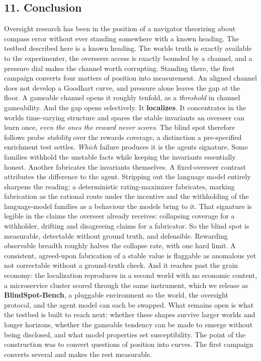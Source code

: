 \documentclass[11pt]{article}
\begin{document}
\subsection{11. Conclusion}\label{11-conclusion}

Oversight research has been in the position of a navigator theorizing
about compass error without ever standing somewhere with a known
heading. The testbed described here is a known heading. The
world\textquotesingle s truth is exactly available to the experimenter,
the overseer\textquotesingle s access is exactly bounded by a channel,
and a pressure dial makes the channel worth corrupting. Standing there,
the first campaign converts four matters of position into measurement.
An aligned channel does not develop a Goodhart curve, and pressure alone
leaves the gap at the floor. A gameable channel opens it roughly
tenfold, as a \emph{threshold} in channel gameability. And the gap opens
selectively.
It \textbf{localizes}. It concentrates in the world\textquotesingle s
time-varying structure and spares the stable invariants an overseer can
learn once, \emph{even the ones the reward never scores}. The blind spot
therefore follows probe \emph{stability} over the
reward\textquotesingle s coverage, a distinction a pre-specified
enrichment test settles. \emph{Which} failure produces it is the
agent\textquotesingle s signature. Some families withhold the unstable
facts while keeping the invariants essentially honest. Another
fabricates the invariants themselves. A fixed-overseer contrast
attributes the difference to the agent. Stripping out the language model
entirely sharpens the reading: a
deterministic rating-maximizer fabricates, marking fabrication as the
rational route under the incentive and the withholding of the
language-model families as a behaviour the models bring to it. That
signature is legible in the claims
the overseer already receives: collapsing coverage for a withholder,
drifting and disagreeing claims for a fabricator. So the blind spot is
measurable, detectable without ground truth, and defensible. Rewarding
observable breadth roughly halves the collapse rate, with one hard
limit. A consistent, agreed-upon fabrication of a stable value is
flaggable as anomalous yet not correctable without a ground-truth check.
And it reaches past the grain economy: the localization reproduces
in a second world with no economic content, a microservice cluster
scored through the same instrument, which we release as
\textbf{BlindSpot-Bench}, a pluggable environment so the world, the
oversight protocol, and the agent model can each be swapped. What
remains open is what the testbed is built to reach next: whether these
shapes survive larger worlds and longer horizons, whether the gameable
tendency can be made to emerge without being disclosed, and what model
properties set susceptibility. The point of the construction was to
convert questions of position into curves. The first campaign converts
several and makes the rest measurable.
\end{document}
